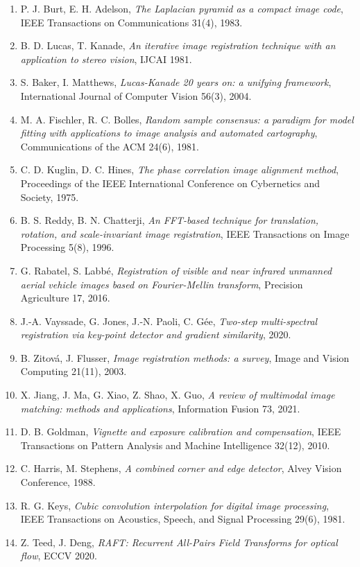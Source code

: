 \documentclass[a4paper,11pt]{report}
\begin{document}
{\begin{enumerate}
	\item\label{ann_burt} P. J. Burt, E. H. Adelson, \emph{The Laplacian pyramid as a compact image code}, IEEE Transactions on Communications 31(4), 1983.
	\item\label{ann_lucas} B. D. Lucas, T. Kanade, \emph{An iterative image registration technique with an application to stereo vision}, IJCAI 1981.
	\item\label{ann_baker} S. Baker, I. Matthews, \emph{Lucas-Kanade 20 years on: a unifying framework}, International Journal of Computer Vision 56(3), 2004.
	\item\label{ann_ransac} M. A. Fischler, R. C. Bolles, \emph{Random sample consensus: a paradigm for model fitting with applications to image analysis and automated cartography}, Communications of the ACM 24(6), 1981.
	\item\label{ann_kuglin} C. D. Kuglin, D. C. Hines, \emph{The phase correlation image alignment method}, Proceedings of the IEEE International Conference on Cybernetics and Society, 1975.
	\item\label{ann_reddy} B. S. Reddy, B. N. Chatterji, \emph{An FFT-based technique for translation, rotation, and scale-invariant image registration}, IEEE Transactions on Image Processing 5(8), 1996.
	\item\label{ann_rabatel} G. Rabatel, S. Labbé, \emph{Registration of visible and near infrared unmanned aerial vehicle images based on Fourier-Mellin transform}, Precision Agriculture 17, 2016.
	\item\label{ann_vayssade} J.-A. Vayssade, G. Jones, J.-N. Paoli, C. Gée, \emph{Two-step multi-spectral registration via key-point detector and gradient similarity}, 2020.
	\item\label{ann_zitova} B. Zitová, J. Flusser, \emph{Image registration methods: a survey}, Image and Vision Computing 21(11), 2003.
	\item\label{ann_jiang} X. Jiang, J. Ma, G. Xiao, Z. Shao, X. Guo, \emph{A review of multimodal image matching: methods and applications}, Information Fusion 73, 2021.
	\item\label{ann_goldman} D. B. Goldman, \emph{Vignette and exposure calibration and compensation}, IEEE Transactions on Pattern Analysis and Machine Intelligence 32(12), 2010.
	\item\label{ann_harris} C. Harris, M. Stephens, \emph{A combined corner and edge detector}, Alvey Vision Conference, 1988.
	\item\label{ann_keys} R. G. Keys, \emph{Cubic convolution interpolation for digital image processing}, IEEE Transactions on Acoustics, Speech, and Signal Processing 29(6), 1981.
	\item\label{ann_raft} Z. Teed, J. Deng, \emph{RAFT: Recurrent All-Pairs Field Transforms for optical flow}, ECCV 2020.
\end{enumerate}}
\end{document}
